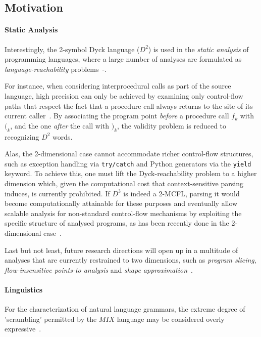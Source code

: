\documentclass{llncs}
\begin{document}
\subsection{Motivation}

\paragraph{\textbf{Static Analysis}}
Interestingly, the 2-symbol Dyck language ($D^2$) is used in the \textit{static analysis} of programming languages, where a large number of analyses are formulated as \textit{language-reachability} problems~-\cite{reps}.

For instance, when considering interprocedural calls as part of the source language, high precision can only be achieved by examining only control-flow paths that respect the fact that a procedure call always returns to the site of its current caller~\cite{reps2}. By associating the program point \textit{before} a procedure call $f_k$ with $(_k$, and the one \textit{after} the call with $)_k$, the validity problem is reduced to recognizing $D^2$ words. 

Alas, the 2-dimensional case cannot accommodate richer control-flow structures, such as exception handling via \texttt{try/catch} and Python generators via the \texttt{yield} keyword. To achieve this, one must lift the Dyck-reachability problem to a higher dimension which, given the computational cost that context-sensitive parsing induces, is currently prohibited. If $D^3$ is indeed a 2-MCFL, parsing it would become computationally attainable for these purposes and eventually allow scalable analysis for non-standard control-flow mechanisms by exploiting the specific structure of analysed programs, as has been recently done in the 2-dimensional case~\cite{andreas}.

Last but not least, future research directions will open up in a multitude of analyses that are currently restrained to two dimensions, such as \textit{program slicing}, \textit{flow-insensitive points-to analysis} and \textit{shape approximation}~\cite{reps}.

\paragraph{\textbf{Linguistics}}
For the characterization of natural language grammars, the extreme degree of ’scrambling’ permitted by the $MIX$ language may be considered overly expressive~\cite{kanazawa}.
\end{document}
